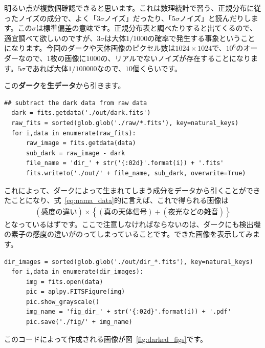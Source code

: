 明るい点が複数個確認できると思います。これは数理統計で習う、正規分布に従ったノイズの成分で、よく「3$\sigma$ノイズ」だったり、「5$\sigma$ノイズ」と読んだりします。この$\sigma$は標準偏差の意味です。正規分布表と調べたりすると出てくるので、適宜調べて欲しいのですが、3$\sigma$は大体$1/1000$の確率で発生する事象ということになります。今回のダークや天体画像のピクセル数は$1024\times1024$で、$10^{6}$のオーダーなので、1枚の画像に$1000$の、リアルでないノイズが存在することになります。$5\sigma$であれば大体$1/100000$なので、$10$個くらいです。\par
この\textbf{ダーク}を\textbf{生データ}から引きます。
\begin{lstlisting}[caption=生データからダークを引く, label=code:darkhiki]
  ## subtract the dark data from raw data
  dark = fits.getdata('./out/dark.fits')
  raw_fits = sorted(glob.glob('./raw/*.fits'), key=natural_keys)
  for i,data in enumerate(raw_fits):
      raw_image = fits.getdata(data)
      sub_dark = raw_image - dark
      file_name = 'dir_' + str('{:02d}'.format(i)) + '.fits'
      fits.writeto('./out/' + file_name, sub_dark, overwrite=True)
\end{lstlisting}
これによって、ダークによって生まれてしまう成分をデータから引くことができたことになり、式~\eqref{eq:nama_data}的に言えば、これで得られる画像は
\begin{align}
  (\text{感度の違い}) \times \left\{  (\text{真の天体信号})+(夜光などの雑音) \right\}\label{eq:dir_data}
\end{align}
となっているはずです。ここで注意しなければならないのは、ダークにも検出機の素子の感度の違いがのってしまっていることです。できた画像を表示してみます。
\begin{lstlisting}[caption=ダーク引き済み画像の表示, label=code:darked_fig]
  dir_images = sorted(glob.glob('./out/dir_*.fits'), key=natural_keys)
  for i,data in enumerate(dir_images):
      img = fits.open(data)
      pic = aplpy.FITSFigure(img)
      pic.show_grayscale()
      img_name = 'fig_dir_' + str('{:02d}'.format(i)) + '.pdf'
      pic.save('./fig/' + img_name)
\end{lstlisting}
このコードによって作成される画像が図~\ref{fig:darked_figs}です。
